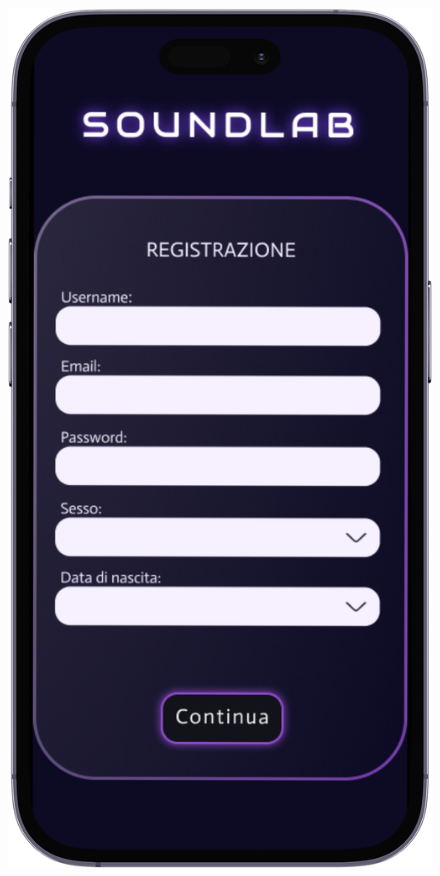 \documentclass{article}
\begin{document}
			\begin{figure}[htbp]
				\centering
				\begin{minipage}{0.18\textwidth}
					\includegraphics[width=\textwidth]{foto1}
				\end{minipage}

\end{figure}
\end{document}
